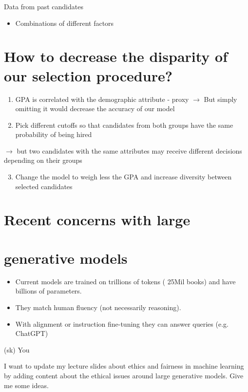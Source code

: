 \documentclass[10pt]{article}
\begin{document}
Data from past candidates

\begin{itemize}
  \item Combinations of different factors
\end{itemize}

\section*{How to decrease the disparity of our selection procedure?}
\begin{enumerate}
  \item GPA is correlated with the demographic attribute - proxy $\rightarrow$ But simply omitting it would decrease the accuracy of our model

  \item Pick different cutoffs so that candidates from both groups have the same probability of being hired

\end{enumerate}

$\rightarrow$ but two candidates with the same attributes may receive different decisions depending on their groups

\begin{enumerate}
  \setcounter{enumi}{2}
  \item Change the model to weigh less the GPA and increase diversity between selected candidates
\end{enumerate}

\section*{Recent concerns with large}
\section*{generative models}
\begin{itemize}
  \item Current models are trained on trillions of tokens ( 25Mil books) and have billions of parameters.
  \item They match human fluency (not necessarily reasoning).
  \item With alignment or instruction fine-tuning they can answer queries (e.g. ChatGPT)
\end{itemize}

(sk) You

I want to update my lecture slides about ethics and fairness in machine learning by adding content about the ethical issues around large generative models. Give me some ideas.
\end{document}
